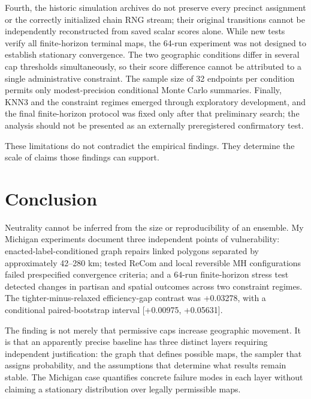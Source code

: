 \documentclass[
  10pt,
]{article}
\begin{document}
Fourth, the historic simulation archives do not preserve every precinct
assignment or the correctly initialized chain RNG stream; their original
transitions cannot be independently reconstructed from saved scalar
scores alone. While new tests verify all finite-horizon terminal maps,
the 64-run experiment was not designed to establish stationary
convergence. The two geographic conditions differ in several cap
thresholds simultaneously, so their score difference cannot be
attributed to a single administrative constraint. The sample size of 32
endpoints per condition permits only modest-precision conditional Monte
Carlo summaries. Finally, KNN3 and the constraint regimes emerged
through exploratory development, and the final finite-horizon protocol
was fixed only after that preliminary search; the analysis should not be
presented as an externally preregistered confirmatory test.

These limitations do not contradict the empirical findings. They
determine the scale of claims those findings can support.

\hypertarget{conclusion}{%
\section{Conclusion}\label{conclusion}}

Neutrality cannot be inferred from the size or reproducibility of an
ensemble. My Michigan experiments document three independent points of
vulnerability: enacted-label-conditioned graph repairs linked polygons
separated by approximately 42--280 km; tested ReCom and local reversible
MH configurations failed prespecified convergence criteria; and a 64-run
finite-horizon stress test detected changes in partisan and spatial
outcomes across two constraint regimes. The tighter-minus-relaxed
efficiency-gap contrast was +0.03278, with a conditional
paired-bootstrap interval {[}+0.00975, +0.05631{]}.

The finding is not merely that permissive caps increase geographic
movement. It is that an apparently precise baseline has three distinct
layers requiring independent justification: the graph that defines
possible maps, the sampler that assigns probability, and the assumptions
that determine what results remain stable. The Michigan case quantifies
concrete failure modes in each layer without claiming a stationary
distribution over legally permissible maps.
\end{document}
